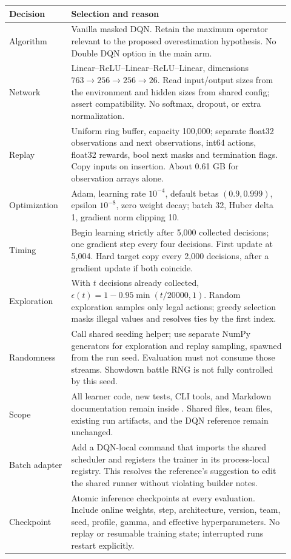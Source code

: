 \documentclass[11pt,a4paper]{article}
\newcommand{\code}[1]{\texttt{\detokenize{#1}}}
\begin{document}
\begin{longtable}{p{0.20\linewidth}p{0.72\linewidth}}
\toprule
Decision & Selection and reason\\
\midrule
Algorithm & Vanilla masked DQN. Retain the maximum operator relevant to the proposed overestimation hypothesis. No Double DQN option in the main arm.\\
Network & Linear--ReLU--Linear--ReLU--Linear, dimensions $763\to256\to256\to26$. Read input/output sizes from the environment and hidden sizes from shared config; assert compatibility. No softmax, dropout, or extra normalization.\\
Replay & Uniform ring buffer, capacity 100,000; separate float32 observations and next observations, int64 actions, float32 rewards, bool next masks and termination flags. Copy inputs on insertion. About 0.61 GB for observation arrays alone.\\
Optimization & Adam, learning rate $10^{-4}$, default betas $(0.9,0.999)$, epsilon $10^{-8}$, zero weight decay; batch 32, Huber delta 1, gradient norm clipping 10.\\
Timing & Begin learning strictly after 5,000 collected decisions; one gradient step every four decisions. First update at 5,004. Hard target copy every 2,000 decisions, after a gradient update if both coincide.\\
Exploration & With $t$ decisions already collected, $\epsilon(t)=1-0.95\min(t/20000,1)$. Random exploration samples only legal actions; greedy selection masks illegal values and resolves ties by the first index.\\
Randomness & Call shared seeding helper; use separate NumPy generators for exploration and replay sampling, spawned from the run seed. Evaluation must not consume those streams. Showdown battle RNG is not fully controlled by this seed.\\
Scope & All learner code, new tests, CLI tools, and Markdown documentation remain inside \code{src/DQN/}. Shared files, team files, existing run artifacts, and the DQN reference remain unchanged.\\
Batch adapter & Add a DQN-local command that imports the shared scheduler and registers the trainer in its process-local registry. This resolves the reference's suggestion to edit the shared runner without violating builder notes.\\
Checkpoint & Atomic inference checkpoints at every evaluation. Include online weights, step, architecture, version, team, seed, profile, gamma, and effective hyperparameters. No replay or resumable training state; interrupted runs restart explicitly.\\
\bottomrule
\end{longtable}
\end{document}

